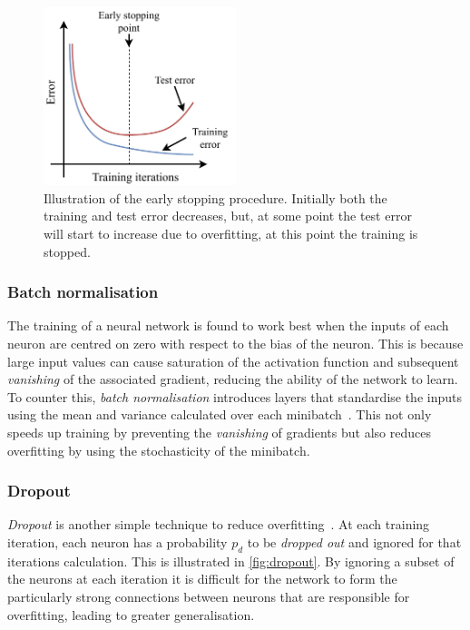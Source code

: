 \begin{figure} %
    \includegraphics[width=0.5\textwidth]{diagrams/6-cvn/early_stopping.pdf}
    \caption[Illustration of the early stopping procedure.]
    {Illustration of the early stopping procedure. Initially both the training and test error
        decreases, but, at some point the test error will start to increase due to overfitting, at
        this point the training is stopped.}
    \label{fig:early_stopping}
\end{figure}

\subsubsection*{Batch normalisation} %

The training of a neural network is found to work best when the inputs of each neuron are centred
on zero with respect to the bias of the neuron. This is because large input values can cause
saturation of the activation function and subsequent \emph{vanishing} of the associated gradient,
reducing the ability of the network to learn. To counter this, \emph{batch normalisation}
introduces layers that standardise the inputs using the mean and variance calculated over each
minibatch~\cite{ioffe2015}. This not only speeds up training by preventing the \emph{vanishing} of
gradients but also reduces overfitting by using the stochasticity of the minibatch.

\subsubsection*{Dropout} %

\emph{Dropout} is another simple technique to reduce overfitting~\cite{hinton2012}. At each
training iteration, each neuron has a probability $p_{d}$ to be \emph{dropped out} and ignored for
that iterations calculation. This is illustrated in \ref{fig:dropout}. By ignoring a subset of the
neurons at each iteration it is difficult for the network to form the particularly strong
connections between neurons that are responsible for overfitting, leading to greater
generalisation.

